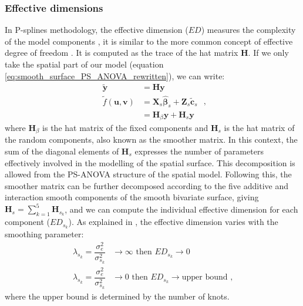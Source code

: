 \subsubsection{Effective dimensions}
In P-splines methodology, the effective dimension ($ED$) measures the complexity of the model components \parencite{eilers_twenty_2015}, it is similar to the more common concept of effective degree of freedom \parencite{buja1989linear}. It is computed as the trace of the hat matrix $\mathbf{H}$. If we only take the spatial part of our model (equation \ref{eq:smooth_surface_PS_ANOVA_rewritten}), we can write:
\begin{equation}
	\begin{aligned}
		\tilde{\mathbf{y}} &= \mathbf{Hy} \\
		\tilde{f}(\mathbf{u},\mathbf{v}) &= \boldsymbol{X}_{s} \hat{\boldsymbol{\beta}}_{s}+
											\boldsymbol{Z}_{s} \tilde{\boldsymbol{c}}_{s} \\
			&= \mathbf{H}_{\beta}\mathbf{y} + \mathbf{H}_{s}\mathbf{y}
	\end{aligned}
	\text{ ,}
\end{equation}
where $\mathbf{H}_{\beta}$ is the hat matrix of the fixed components and $\mathbf{H}_{s}$ is the hat matrix of the random components, also known as the smoother matrix. In this context, the sum of the diagonal elements of $\mathbf{H}_{s}$ expresses the number of parameters effectively involved in the modelling of the spatial surface. This decomposition is allowed from the PS-ANOVA structure of the spatial model. Following this, the smoother matrix can be further decomposed according to the five additive and interaction smooth components of the smooth bivariate surface, giving $\mathbf{H}_{s} = \sum_{k=1}^{5} \mathbf{H}_{s_{k}}$, and we can compute the individual effective dimension for each component ($ED_{s_{k}}$). As explained in \textcite{rodriguez-alvarez_spatial_2016}, the effective dimension varies with the smoothing parameter:
\begin{equation}
	\begin{aligned}
		\lambda_{s_{k}} = \dfrac{\sigma^2_{e}}{\sigma^2_{s_{k}}} & \rightarrow \infty \text{  then  } ED_{s_{k}} \rightarrow 0 \\
		\lambda_{s_{k}} = \dfrac{\sigma^2_{e}}{\sigma^2_{s_{k}}} & \rightarrow 0 \text{  then  } ED_{s_{k}} \rightarrow 
			\text{upper bound}\text{ ,}
	\end{aligned}
\end{equation}
where the upper bound is determined by the number of knots.
\\

